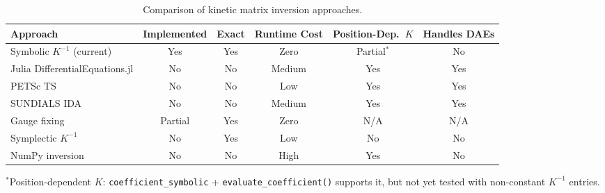 \begin{table}[htbp]
\centering
\caption{Comparison of kinetic matrix inversion approaches.}
\label{tab:kinetic-decision}
\begin{tabular}{@{}lccccc@{}}
\toprule
Approach & Implemented & Exact & Runtime Cost & Position-Dep.\ $K$ & Handles DAEs \\
\midrule
Symbolic $K^{-1}$ (current)      & Yes     & Yes & Zero   & Partial$^*$ & No  \\
Julia DifferentialEquations.jl   & No      & No  & Medium & Yes         & Yes \\
PETSc TS                         & No      & No  & Low    & Yes         & Yes \\
SUNDIALS IDA                     & No      & No  & Medium & Yes         & Yes \\
Gauge fixing                     & Partial & Yes & Zero   & N/A         & N/A \\
Symplectic $K^{-1}$              & No      & Yes & Low    & No          & No  \\
NumPy inversion                  & No      & No  & High   & Yes         & No  \\
\bottomrule
\end{tabular}
\end{table}

$^*$Position-dependent $K$: \texttt{coefficient\_symbolic} + \texttt{evaluate\_coefficient()} supports it, but not yet tested with non-constant $K^{-1}$ entries.
